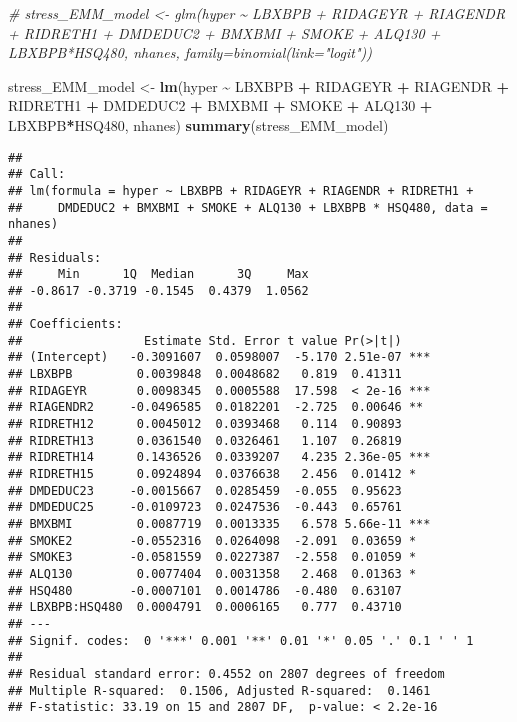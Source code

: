 \documentclass[
]{article}
\newenvironment{Shaded}{\begin{snugshade}}{\end{snugshade}}
\newcommand{\CommentTok}[1]{\textcolor[rgb]{0.56,0.35,0.01}{\textit{#1}}}
\newcommand{\FunctionTok}[1]{\textcolor[rgb]{0.13,0.29,0.53}{\textbf{#1}}}
\newcommand{\NormalTok}[1]{#1}
\newcommand{\OtherTok}[1]{\textcolor[rgb]{0.56,0.35,0.01}{#1}}
\newcommand{\SpecialCharTok}[1]{\textcolor[rgb]{0.81,0.36,0.00}{\textbf{#1}}}
\begin{document}
\begin{Shaded}
\begin{Highlighting}[]
\CommentTok{\# stress\_EMM\_model \textless{}{-} glm(hyper \textasciitilde{} LBXBPB + RIDAGEYR + RIAGENDR + RIDRETH1 + DMDEDUC2 + BMXBMI + SMOKE + ALQ130 + LBXBPB*HSQ480, nhanes, family=binomial(link="logit"))}

\NormalTok{stress\_EMM\_model }\OtherTok{\textless{}{-}} \FunctionTok{lm}\NormalTok{(hyper }\SpecialCharTok{\textasciitilde{}}\NormalTok{ LBXBPB }\SpecialCharTok{+}\NormalTok{ RIDAGEYR }\SpecialCharTok{+}\NormalTok{ RIAGENDR }\SpecialCharTok{+}\NormalTok{ RIDRETH1 }\SpecialCharTok{+}\NormalTok{ DMDEDUC2 }\SpecialCharTok{+}\NormalTok{ BMXBMI }\SpecialCharTok{+}\NormalTok{ SMOKE }\SpecialCharTok{+}\NormalTok{ ALQ130 }\SpecialCharTok{+}\NormalTok{ LBXBPB}\SpecialCharTok{*}\NormalTok{HSQ480, nhanes)}
\FunctionTok{summary}\NormalTok{(stress\_EMM\_model)}
\end{Highlighting}
\end{Shaded}

\begin{verbatim}
## 
## Call:
## lm(formula = hyper ~ LBXBPB + RIDAGEYR + RIAGENDR + RIDRETH1 + 
##     DMDEDUC2 + BMXBMI + SMOKE + ALQ130 + LBXBPB * HSQ480, data = nhanes)
## 
## Residuals:
##     Min      1Q  Median      3Q     Max 
## -0.8617 -0.3719 -0.1545  0.4379  1.0562 
## 
## Coefficients:
##                 Estimate Std. Error t value Pr(>|t|)    
## (Intercept)   -0.3091607  0.0598007  -5.170 2.51e-07 ***
## LBXBPB         0.0039848  0.0048682   0.819  0.41311    
## RIDAGEYR       0.0098345  0.0005588  17.598  < 2e-16 ***
## RIAGENDR2     -0.0496585  0.0182201  -2.725  0.00646 ** 
## RIDRETH12      0.0045012  0.0393468   0.114  0.90893    
## RIDRETH13      0.0361540  0.0326461   1.107  0.26819    
## RIDRETH14      0.1436526  0.0339207   4.235 2.36e-05 ***
## RIDRETH15      0.0924894  0.0376638   2.456  0.01412 *  
## DMDEDUC23     -0.0015667  0.0285459  -0.055  0.95623    
## DMDEDUC25     -0.0109723  0.0247536  -0.443  0.65761    
## BMXBMI         0.0087719  0.0013335   6.578 5.66e-11 ***
## SMOKE2        -0.0552316  0.0264098  -2.091  0.03659 *  
## SMOKE3        -0.0581559  0.0227387  -2.558  0.01059 *  
## ALQ130         0.0077404  0.0031358   2.468  0.01363 *  
## HSQ480        -0.0007101  0.0014786  -0.480  0.63107    
## LBXBPB:HSQ480  0.0004791  0.0006165   0.777  0.43710    
## ---
## Signif. codes:  0 '***' 0.001 '**' 0.01 '*' 0.05 '.' 0.1 ' ' 1
## 
## Residual standard error: 0.4552 on 2807 degrees of freedom
## Multiple R-squared:  0.1506, Adjusted R-squared:  0.1461 
## F-statistic: 33.19 on 15 and 2807 DF,  p-value: < 2.2e-16
\end{verbatim}
\end{document}
